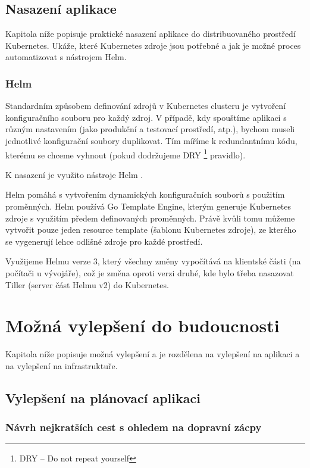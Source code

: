 \documentclass[thesis=M,czech]{FITthesis}[2019/12/23]
\theoremstyle{plain}
\theoremstyle{definition}
\begin{document}
\section{Nasazení aplikace}

Kapitola níže popisuje praktické nasazení aplikace do distribuovaného prostředí Kubernetes. Ukáže, které Kubernetes zdroje jsou potřebné a jak je možné proces automatizovat s nástrojem Helm. 


\subsection{Helm}



Standardním způsobem definování zdrojů v Kubernetes clusteru je vytvoření konfiguračního souboru pro každý zdroj. V případě, kdy spouštíme aplikaci s různým nastavením (jako produkční a testovací prostředí, atp.), bychom museli jednotlivé konfigurační soubory duplikovat. Tím míříme k redundantnímu kódu, kterému se chceme vyhnout (pokud dodržujeme DRY \footnote{DRY -- Do not repeat yourself} pravidlo).

K nasazení je využito nástroje Helm \cite{helm-docs}.

Helm pomáhá s vytvořením dynamických konfiguračních souborů s použitím proměnných. Helm používá Go Template Engine, kterým generuje Kubernetes zdroje s využitím předem definovaných proměnných. Právě kvůli tomu můžeme vytvořit pouze jeden resource template (šablonu Kubernetes zdroje), ze kterého se vygenerují lehce odlišné zdroje pro každé prostředí. 

Využijeme Helmu verze 3, který všechny změny vypočítává na klientské části (na počítači u vývojáře), což je změna oproti verzi druhé, kde bylo třeba nasazovat Tiller (server část Helmu v2) do Kubernetes.


\chapter{Možná vylepšení do budoucnosti}
Kapitola níže popisuje možná vylepšení a je rozdělena na vylepšení na aplikaci a na vylepšení na infrastruktuře.

\section{Vylepšení na plánovací aplikaci}

\subsection{Návrh nejkratších cest s ohledem na dopravní zácpy}
\end{document}
